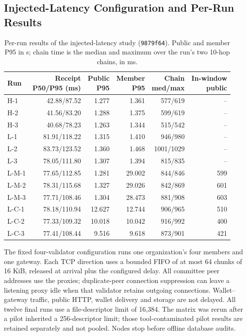\subsection{Injected-Latency Configuration and Per-Run Results}
\begin{table}[t]
  \caption{Per-run results of the injected-latency study (\texttt{9879f64}). Public and member P95 in s; chain time is the median and maximum over the run's two 10-hop chains, in ms.}
  \label{tab:supp-faults}
  \centering
  \small
  \setlength{\tabcolsep}{3.5pt}
  \begin{tabular}{@{}lrrrrr@{}}
    \toprule
    Run & \shortstack{Receipt\\P50/P95 (ms)} & \shortstack{Public\\P95} & \shortstack{Member\\P95} & \shortstack{Chain\\med/max} & \shortstack{In-window\\public} \\
    \midrule
    H-1   & 42.88/87.52 & 1.277  & 1.361  & 577/619  & -- \\
    H-2   & 41.56/83.20 & 1.288  & 1.375  & 599/619  & -- \\
    H-3   & 40.68/78.23 & 1.263  & 1.344  & 515/542  & -- \\
    L-1   & 81.91/118.22 & 1.315 & 1.410  & 946/980  & -- \\
    L-2   & 83.73/123.52 & 1.360 & 1.468  & 1001/1029 & -- \\
    L-3   & 78.05/111.80 & 1.307 & 1.394  & 815/835  & -- \\
    L-M-1 & 77.65/112.85 & 1.281 & 29.002 & 844/846  & 599 \\
    L-M-2 & 78.31/115.68 & 1.327 & 29.026 & 842/869  & 601 \\
    L-M-3 & 77.71/108.46 & 1.304 & 28.473 & 881/908  & 603 \\
    L-C-1 & 78.18/110.94 & 12.627 & 12.744 & 906/965 & 510 \\
    L-C-2 & 77.33/109.32 & 10.018 & 10.042 & 916/992 & 400 \\
    L-C-3 & 77.41/108.44 & 9.516  & 9.618  & 873/901 & 421 \\
    \bottomrule
  \end{tabular}
\end{table}
The fixed four-validator configuration runs one organization's four members and one gateway. Each TCP direction uses a bounded FIFO of at most 64 chunks of 16 KiB, released at arrival plus the configured delay. All committee peer addresses use the proxies; duplicate-peer connection suppression can leave a listening proxy idle when that validator retains outgoing connections. Wallet--gateway traffic, public HTTP, wallet delivery and storage are not delayed. All twelve final runs use a file-descriptor limit of 16,384. The matrix was rerun after a pilot inherited a 256-descriptor limit; those tool-contaminated pilot results are retained separately and not pooled. Nodes stop before offline database audits.

